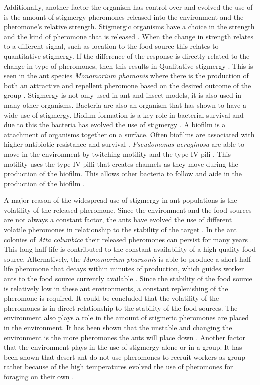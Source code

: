 Additionally, another factor the organism has control over and evolved the use of is the amount of stigmergy pheromones released into the environment and the pheromone’s relative strength.
Stigmergic organisms have a choice in the strength and the kind of pheromone that is released \cite{dorigo_ant_2000}.
When the change in strength relates to a different signal, such as location to the food source this relates to quantitative stigmergy.
If the difference of the response is directly related to the change in type of pheromones, then this results in Qualitative stigmergy \cite{heylighen_stigmergy_2016b}.
This is seen in the ant species \textit{Monomorium pharaonis} where there is the production of both an attractive and repellent pheromone based on the desired outcome of the group \cite{jeanson_pheromone_2003}.
Stigmergy is not only used in ant and insect models, it is also used in many other organisms.
Bacteria are also an organism that has shown to have a wide use of stigmergy.
Biofilm formation is a key role in bacterial survival and due to this the bacteria has evolved the use of stigmergy \cite{gloag_bacterial_2015}.
A biofilm is a attachment of organisms together on a surface.
Often biofilms are associated with higher antibiotic resistance and survival \cite{donlan2002biofilms}.
\textit{Pseudomonas aeruginosa} are able to move in the environment by twitching motility and the type IV pili \cite{persat2015type}.
This motility uses the type IV pilli that creates channels as they move during the production of the biofilm.
This allows other bacteria to follow and aide in the production of the biofilm \cite{gloag_stigmergy:_2013}.

A major reason of the widespread use of stigmergy in ant populations is the volatility of the released pheromone.
Since the environment and the food sources are not always a constant factor, the ants have evolved the use of different volatile pheromones in relationship to the stability of the target \cite{jeanson_pheromone_2003}.
In the ant colonies of \textit{Atta columbica} their released pheromones can persist for many years \cite{howard_costs_2001}.
This long half-life is contributed to the constant availability of a high quality food source.
Alternatively, the \textit{Monomorium pharaonis} is able to produce a short half-life pheromone that decays within minutes of production, which guides worker ants to the food source currently available \cite{robinson_decay_2008}.
Since the stability of the food source is relatively low in these ant environments, a constant replenishing of the pheromone is required.
It could be concluded that the volatility of the pheromones is in direct relationship to the stability of the food sources.
The environment also plays a role in the amount of stigmeric pheromones are placed in the environment.
It has been shown that the unstable and changing the environment is the more pheromones the ants will place down \cite{czaczkes2015trail}.
Another factor that the environment plays in the use of stigmergy alone or in a group.
It has been shown that desert ant do not use pheromones to recruit workers as group rather because of the high temperatures evolved the use of pheromones for foraging on their own \cite{ruano_high_2000}.

